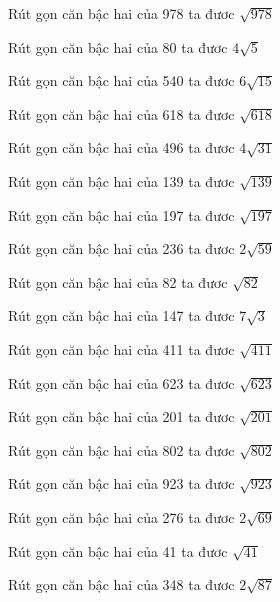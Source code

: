 \documentclass[12pt,a4paper]{article}
\begin{document}
\begin{ex}
Rút gọn căn bậc hai của 978 ta đươc $\sqrt{978}$
\end{ex}
\begin{ex}
Rút gọn căn bậc hai của 80 ta đươc $4\sqrt{5}$
\end{ex}
\begin{ex}
Rút gọn căn bậc hai của 540 ta đươc $6\sqrt{15}$
\end{ex}
\begin{ex}
Rút gọn căn bậc hai của 618 ta đươc $\sqrt{618}$
\end{ex}
\begin{ex}
Rút gọn căn bậc hai của 496 ta đươc $4\sqrt{31}$
\end{ex}
\begin{ex}
Rút gọn căn bậc hai của 139 ta đươc $\sqrt{139}$
\end{ex}
\begin{ex}
Rút gọn căn bậc hai của 197 ta đươc $\sqrt{197}$
\end{ex}
\begin{ex}
Rút gọn căn bậc hai của 236 ta đươc $2\sqrt{59}$
\end{ex}
\begin{ex}
Rút gọn căn bậc hai của 82 ta đươc $\sqrt{82}$
\end{ex}
\begin{ex}
Rút gọn căn bậc hai của 147 ta đươc $7\sqrt{3}$
\end{ex}
\begin{ex}
Rút gọn căn bậc hai của 411 ta đươc $\sqrt{411}$
\end{ex}
\begin{ex}
Rút gọn căn bậc hai của 623 ta đươc $\sqrt{623}$
\end{ex}
\begin{ex}
Rút gọn căn bậc hai của 201 ta đươc $\sqrt{201}$
\end{ex}
\begin{ex}
Rút gọn căn bậc hai của 802 ta đươc $\sqrt{802}$
\end{ex}
\begin{ex}
Rút gọn căn bậc hai của 923 ta đươc $\sqrt{923}$
\end{ex}
\begin{ex}
Rút gọn căn bậc hai của 276 ta đươc $2\sqrt{69}$
\end{ex}
\begin{ex}
Rút gọn căn bậc hai của 41 ta đươc $\sqrt{41}$
\end{ex}
\begin{ex}
Rút gọn căn bậc hai của 348 ta đươc $2\sqrt{87}$
\end{ex}
\end{document}
